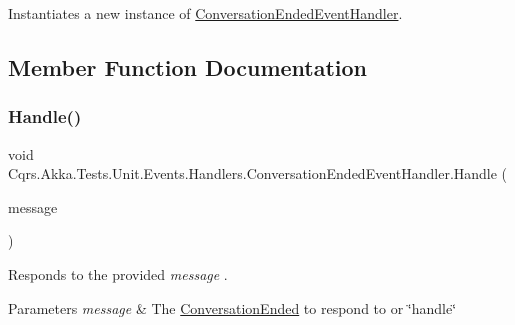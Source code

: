 Instantiates a new instance of \hyperlink{classCqrs_1_1Akka_1_1Tests_1_1Unit_1_1Events_1_1Handlers_1_1ConversationEndedEventHandler}{Conversation\+Ended\+Event\+Handler}. 



\subsection{Member Function Documentation}
\mbox{\label{classCqrs_1_1Akka_1_1Tests_1_1Unit_1_1Events_1_1Handlers_1_1ConversationEndedEventHandler_a1e363c715cefdb600705d7b3f5e3bca6_a1e363c715cefdb600705d7b3f5e3bca6}} 
\subsubsection{\texorpdfstring{Handle()}{Handle()}}
{\footnotesize\ttfamily void Cqrs.\+Akka.\+Tests.\+Unit.\+Events.\+Handlers.\+Conversation\+Ended\+Event\+Handler.\+Handle (\begin{DoxyParamCaption}\item[{\hyperlink{classCqrs_1_1Akka_1_1Tests_1_1Unit_1_1Events_1_1ConversationEnded}{Conversation\+Ended}}]{message }\end{DoxyParamCaption})}



Responds to the provided {\itshape message} . 


\begin{DoxyParams}{Parameters}
{\em message} & The \hyperlink{classCqrs_1_1Akka_1_1Tests_1_1Unit_1_1Events_1_1ConversationEnded}{Conversation\+Ended} to respond to or \char`\"{}handle\char`\"{}\\
\hline
\end{DoxyParams}


